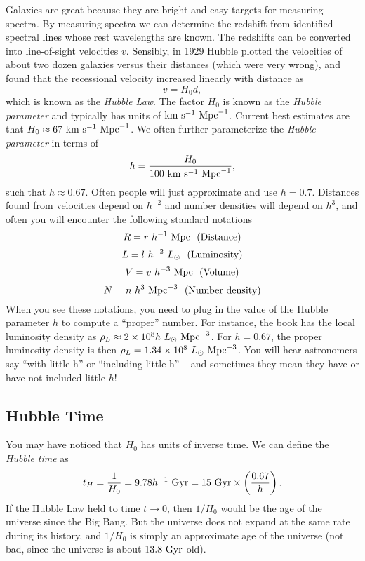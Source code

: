 \documentclass[]{article}
\begin{document}
Galaxies are great because they are bright and easy targets for
measuring spectra. By measuring spectra we can determine the 
redshift from identified spectral lines whose rest wavelengths are
known. The redshifts can be converted into line-of-sight velocities $v$.
Sensibly, in 1929 Hubble plotted the velocities of about two dozen
galaxies versus their distances (which were very wrong), and 
found that the recessional velocity increased linearly with distance as
\begin{equation}
v = H_{0} d,
\end{equation}
\noindent
which is known as the {\it Hubble Law}.  The factor $H_0$ is known
as the {\it Hubble parameter} and typically has units 
of $\mathrm{km}~\mathrm{s}^{-1}~\mathrm{Mpc}^{-1}$. Current best estimates are that
$H_0\approx67~\mathrm{km}~\mathrm{s}^{-1}~\mathrm{Mpc}^{-1}$. We often further
parameterize the {\it Hubble parameter} in terms of
\begin{equation}
h = \frac{H_0}{100~\mathrm{km}~\mathrm{s}^{-1}~\mathrm{Mpc}^{-1}},
\end{equation}
\noindent
such that $h\approx0.67$. Often people will just approximate and
use $h=0.7$. Distances found from velocities depend on $h^{-2}$ and
number densities will depend on $h^{3}$, and often you will encounter
the following standard notations
\begin{equation}
R = r~h^{-1}~\mathrm{Mpc}~~\mathrm{(Distance)}
\end{equation}
\begin{equation}
L = l~h^{-2}~L_{\odot}~~\mathrm{(Luminosity)}
\end{equation}
\begin{equation}
V = v~h^{-3}~\mathrm{Mpc}~~\mathrm{(Volume)}
\end{equation}
\begin{equation}
N = n~h^{3}~\mathrm{Mpc}^{-3}~~\mathrm{(Number~density)}
\end{equation}
\noindent
When you see these notations, you need to plug in the value of the
Hubble parameter $h$ to compute a ``proper'' number.  For instance,
the book has the local luminosity density as 
$\rho_{L}\approx2\times10^{8}h~L_{\odot}~\mathrm{Mpc}^{-3}$. For $h=0.67$, the
proper luminosity density is then $\rho_L = 1.34\times10^{8}~L_{\odot}~\mathrm{Mpc}^{-3}$.
You will hear astronomers say ``with little h'' or ``including little h'' --
and sometimes they mean they have or have not included little $h$!

\subsection{Hubble Time}
You may have noticed that $H_0$ has units of inverse time. We can
define the {\it Hubble time} as 
\begin{equation}
t_{H} = \frac{1}{H_0} = 9.78h^{-1}~\mathrm{Gyr} = 15~\mathrm{Gyr} \times \left(\frac{0.67}{h}\right).
\end{equation}
\noindent
If the Hubble Law held to time $t\to0$, then $1/H_0$ would be the age of the
universe since the Big Bang. But the universe does not expand at the
same rate during its history, and $1/H_0$ is simply an approximate age
of the universe (not bad, since the universe is about $13.8~\mathrm{Gyr}$ old).
\end{document}
